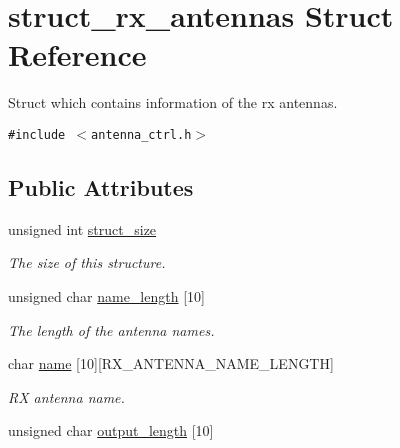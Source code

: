 \hypertarget{structstruct__rx__antennas}{
\section{struct\_\-rx\_\-antennas Struct Reference}
\label{structstruct__rx__antennas}
}
Struct which contains information of the rx antennas.  


{\tt \#include $<$antenna\_\-ctrl.h$>$}

\subsection*{Public Attributes}
\begin{CompactItemize}
\item 
\hypertarget{structstruct__rx__antennas_5527854b63fcdff15ff27e56941ccc3e}{
unsigned int \hyperlink{structstruct__rx__antennas_5527854b63fcdff15ff27e56941ccc3e}{struct\_\-size}}
\label{structstruct__rx__antennas_5527854b63fcdff15ff27e56941ccc3e}

\begin{CompactList}\small\item\em The size of this structure. \item\end{CompactList}\item 
\hypertarget{structstruct__rx__antennas_eab309a86f3902205d6f3c0e61d8e755}{
unsigned char \hyperlink{structstruct__rx__antennas_eab309a86f3902205d6f3c0e61d8e755}{name\_\-length} \mbox{[}10\mbox{]}}
\label{structstruct__rx__antennas_eab309a86f3902205d6f3c0e61d8e755}

\begin{CompactList}\small\item\em The length of the antenna names. \item\end{CompactList}\item 
\hypertarget{structstruct__rx__antennas_3e066bb838e4d496f2f8b8f494f642a4}{
char \hyperlink{structstruct__rx__antennas_3e066bb838e4d496f2f8b8f494f642a4}{name} \mbox{[}10\mbox{]}\mbox{[}RX\_\-ANTENNA\_\-NAME\_\-LENGTH\mbox{]}}
\label{structstruct__rx__antennas_3e066bb838e4d496f2f8b8f494f642a4}

\begin{CompactList}\small\item\em RX antenna name. \item\end{CompactList}\item 
\hypertarget{structstruct__rx__antennas_e0a2730c87bafff0a53fe0ea087996f5}{
unsigned char \hyperlink{structstruct__rx__antennas_e0a2730c87bafff0a53fe0ea087996f5}{output\_\-length} \mbox{[}10\mbox{]}}
\label{structstruct__rx__antennas_e0a2730c87bafff0a53fe0ea087996f5}


\end{CompactItemize}
